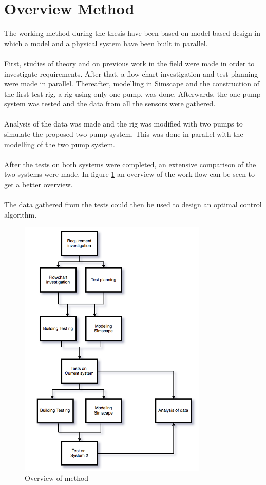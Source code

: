 \section{Overview Method}
The working method during the thesis have been based on model based design in which a model and a physical system have been built in parallel.\\ 
\\
First, studies of theory and on previous work in the field were made in order to investigate requirements. After that, a flow chart investigation and test planning were made in parallel. Thereafter, modelling in Simscape and the construction of the first test rig, a rig using only one  pump,  was done. Afterwards, the one pump system was tested and the data from all the sensors were gathered.\\
\\
Analysis of the data was made and the rig was modified with two pumps to simulate the proposed two pump system. This was done in parallel with the modelling of the two pump system. \\
\\
After the tests on both systems were completed, an extensive comparison of the two systems were made. In figure \ref{fig:metod} an overview of the work flow can be seen to get a better overview.\\
\\
The data gathered from the tests could then be used to design an optimal control algorithm. 

\begin{figure}[h]
    \centering
    \includegraphics[width=0.8\textwidth]{Metod}
    \caption{Overview of method}
    \label{fig:metod}
\end{figure}\newpage





